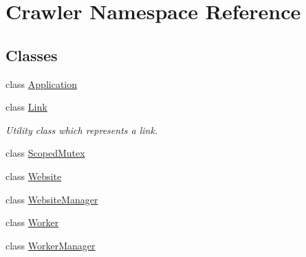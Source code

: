 \hypertarget{namespace_crawler}{}\section{Crawler Namespace Reference}
\label{namespace_crawler}
\subsection*{Classes}
\begin{DoxyCompactItemize}
\item 
class \hyperlink{class_crawler_1_1_application}{Application}
\item 
class \hyperlink{class_crawler_1_1_link}{Link}
\begin{DoxyCompactList}\small\item\em Utility class which represents a link. \end{DoxyCompactList}\item 
class \hyperlink{class_crawler_1_1_scoped_mutex}{Scoped\+Mutex}
\item 
class \hyperlink{class_crawler_1_1_website}{Website}
\item 
class \hyperlink{class_crawler_1_1_website_manager}{Website\+Manager}
\item 
class \hyperlink{class_crawler_1_1_worker}{Worker}
\item 
class \hyperlink{class_crawler_1_1_worker_manager}{Worker\+Manager}
\end{DoxyCompactItemize}
